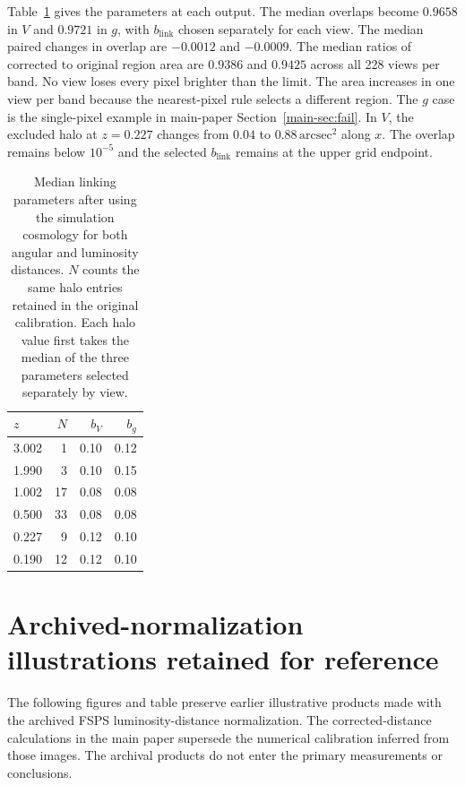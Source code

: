 \documentclass[usenatbib]{mnras}
\begin{document}
Table~\ref{tab:distance} gives the parameters at each output.
The median overlaps become $0.9658$ in $V$ and $0.9721$ in $g$, with
$b_{\mathrm{link}}$ chosen separately for each view. The median paired changes in
overlap are $-0.0012$ and $-0.0009$.
The median ratios of corrected to original region area are $0.9386$
and $0.9425$ across all 228 views per band. No view loses every pixel
brighter than the limit.
The area increases in one view per band because the nearest-pixel
rule selects a different region. The $g$ case is the single-pixel
example in main-paper Section~\ref{main-sec:fail}.
In $V$, the excluded halo at $z=0.227$ changes from $0.04$ to
$0.88\,\mathrm{arcsec}^{2}$ along $x$. The overlap remains below
$10^{-5}$ and the selected $b_{\mathrm{link}}$ remains at the upper grid endpoint.

\begin{table}
\centering
\caption{Median linking parameters after using the simulation cosmology
for both angular and luminosity distances. $N$ counts the same halo
entries retained in the original calibration. Each halo value first
takes the median of the three parameters selected separately by view.}
\label{tab:distance}
\begin{tabular}{lrrr}
\toprule
$z$ & $N$ & $b_{V}$ & $b_{g}$ \\
\midrule
3.002 & 1 & 0.10 & 0.12 \\
1.990 & 3 & 0.10 & 0.15 \\
1.002 & 17 & 0.08 & 0.08 \\
0.500 & 33 & 0.08 & 0.08 \\
0.227 & 9 & 0.12 & 0.10 \\
0.190 & 12 & 0.12 & 0.10 \\
\bottomrule
\end{tabular}
\end{table}



\section{Archived-normalization illustrations retained for reference}
\label{sec:archived-products}
\setcounter{figure}{0}
\setcounter{table}{0}
\renewcommand{\thefigure}{S\arabic{figure}}
\renewcommand{\thetable}{S\arabic{table}}

The following figures and table preserve earlier illustrative products
made with the archived FSPS luminosity-distance normalization. The
corrected-distance calculations in the main paper supersede the numerical
calibration inferred from those images. The archival products do not enter
the primary measurements or conclusions.
\end{document}
